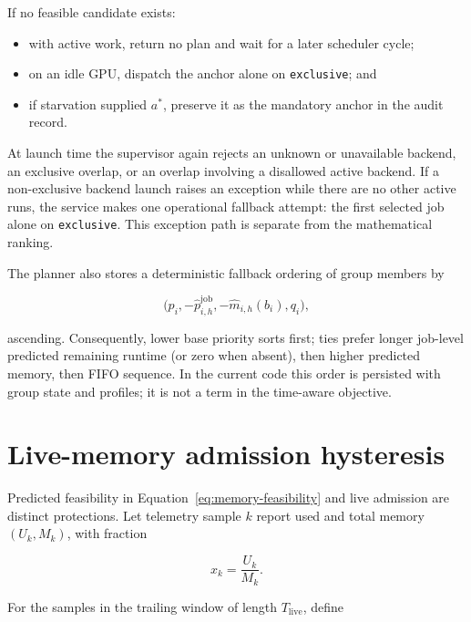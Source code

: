 \documentclass[11pt]{article}
\newcommand{\code}[1]{\textcolor{codeblue}{\texttt{#1}}}
\begin{document}
If no feasible candidate exists:

\begin{itemize}[leftmargin=*]
  \item with active work, return no plan and wait for a later scheduler cycle;
  \item on an idle GPU, dispatch the anchor alone on \code{exclusive}; and
  \item if starvation supplied $a^*$, preserve it as the mandatory anchor in the
        audit record.
\end{itemize}

At launch time the supervisor again rejects an unknown or unavailable backend,
an exclusive overlap, or an overlap involving a disallowed active backend.  If
a non-exclusive backend launch raises an exception while there are no other
active runs, the service makes one operational fallback attempt: the first
selected job alone on \code{exclusive}.  This exception path is separate from
the mathematical ranking.

The planner also stores a deterministic fallback ordering of group members by

\begin{equation}
  \bigl(p_i,-\widehat p^{\mathrm{job}}_{i,h},
        -\widehat m_{i,h}(b_i),q_i\bigr),
  \label{eq:fallback-order}
\end{equation}

ascending.  Consequently, lower base priority sorts first; ties prefer longer
job-level predicted remaining runtime (or zero when absent), then higher
predicted memory, then FIFO sequence.  In the
current code this order is persisted with group state and profiles; it is not a
term in the time-aware objective.

\section{Live-memory admission hysteresis}
\label{sec:live-gate}

Predicted feasibility in Equation~\eqref{eq:memory-feasibility} and live
admission are distinct protections.  Let telemetry sample $k$ report used and
total memory $(U_k,M_k)$, with fraction

\begin{equation}
  x_k=\frac{U_k}{M_k}.
\end{equation}

For the samples in the trailing window of length $T_{\mathrm{live}}$, define
\end{document}

